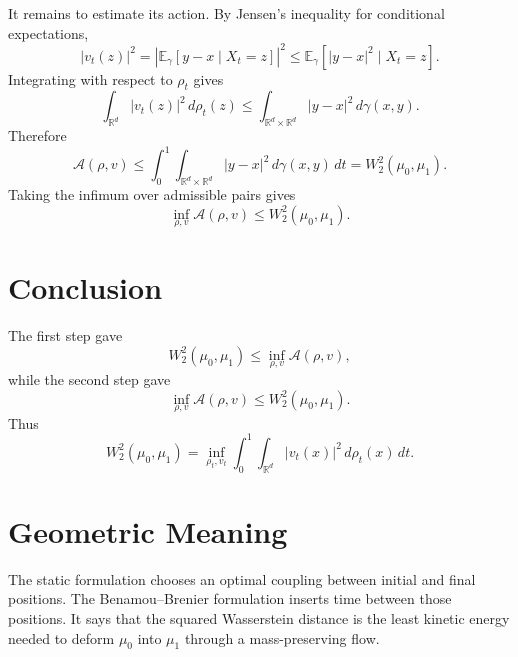 \documentclass[11pt]{article}
\begin{document}
It remains to estimate its action. By Jensen's inequality for conditional
expectations,
\[
|v_t(z)|^2
=
\left|\mathbb E_\gamma[y-x\mid X_t=z]\right|^2
\le
\mathbb E_\gamma[|y-x|^2\mid X_t=z].
\]
Integrating with respect to $\rho_t$ gives
\[
\int_{\mathbb R^d}|v_t(z)|^2\,d\rho_t(z)
\le
\int_{\mathbb R^d\times\mathbb R^d}|y-x|^2\,d\gamma(x,y).
\]
Therefore
\[
\mathcal A(\rho,v)
\le
\int_0^1
\int_{\mathbb R^d\times\mathbb R^d}|y-x|^2\,d\gamma(x,y)\,dt
=
W_2^2(\mu_0,\mu_1).
\]
Taking the infimum over admissible pairs gives
\[
\inf_{\rho,v}\mathcal A(\rho,v)
\le
W_2^2(\mu_0,\mu_1).
\]

\section*{Conclusion}

The first step gave
\[
W_2^2(\mu_0,\mu_1)
\le
\inf_{\rho,v}\mathcal A(\rho,v),
\]
while the second step gave
\[
\inf_{\rho,v}\mathcal A(\rho,v)
\le
W_2^2(\mu_0,\mu_1).
\]
Thus
\[
W_2^2(\mu_0,\mu_1)
=
\inf_{\rho_t,v_t}
\int_0^1\int_{\mathbb R^d}|v_t(x)|^2\,d\rho_t(x)\,dt.
\]

\section*{Geometric Meaning}

The static formulation chooses an optimal coupling between initial and final
positions. The Benamou--Brenier formulation inserts time between those
positions. It says that the squared Wasserstein distance is the least kinetic
energy needed to deform $\mu_0$ into $\mu_1$ through a mass-preserving flow.
\end{document}
